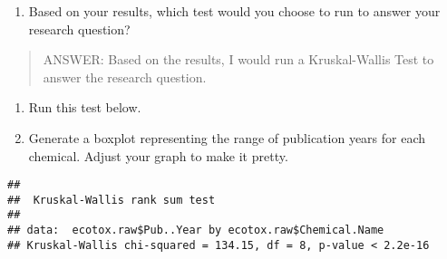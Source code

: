 \documentclass[]{article}
\newenvironment{Shaded}{\begin{snugshade}}{\end{snugshade}}
\newcommand{\KeywordTok}[1]{\textcolor[rgb]{0.13,0.29,0.53}{\textbf{#1}}}
\newcommand{\DataTypeTok}[1]{\textcolor[rgb]{0.13,0.29,0.53}{#1}}
\newcommand{\DecValTok}[1]{\textcolor[rgb]{0.00,0.00,0.81}{#1}}
\newcommand{\StringTok}[1]{\textcolor[rgb]{0.31,0.60,0.02}{#1}}
\newcommand{\CommentTok}[1]{\textcolor[rgb]{0.56,0.35,0.01}{\textit{#1}}}
\newcommand{\OperatorTok}[1]{\textcolor[rgb]{0.81,0.36,0.00}{\textbf{#1}}}
\newcommand{\NormalTok}[1]{#1}
\providecommand{\tightlist}{%
  \setlength{\itemsep}{0pt}\setlength{\parskip}{0pt}}
\begin{document}
\begin{enumerate}
\def\labelenumi{\arabic{enumi}.}
\setcounter{enumi}{5}
\tightlist
\item
  Based on your results, which test would you choose to run to answer
  your research question?
\end{enumerate}

\begin{quote}
ANSWER: Based on the results, I would run a Kruskal-Wallis Test to
answer the research question.
\end{quote}

\begin{enumerate}
\def\labelenumi{\arabic{enumi}.}
\setcounter{enumi}{6}
\item
  Run this test below.
\item
  Generate a boxplot representing the range of publication years for
  each chemical. Adjust your graph to make it pretty.
\end{enumerate}

\begin{Shaded}
\end{Shaded}

\begin{verbatim}
## 
##  Kruskal-Wallis rank sum test
## 
## data:  ecotox.raw$Pub..Year by ecotox.raw$Chemical.Name
## Kruskal-Wallis chi-squared = 134.15, df = 8, p-value < 2.2e-16
\end{verbatim}

\begin{Shaded}
\end{Shaded}
\end{document}
